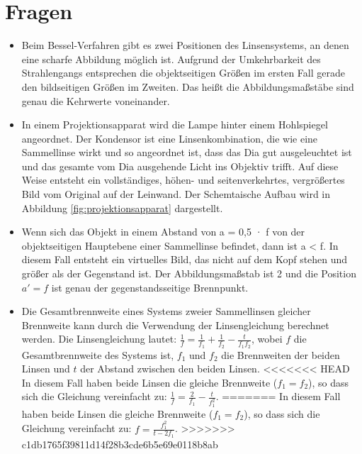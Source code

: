 \documentclass[11pt, a4paper]{article}
\begin{document}
    \section{Fragen}
    \begin{itemize}
        \item Beim Bessel-Verfahren gibt es zwei Positionen des Linsensystems, an denen eine scharfe Abbildung möglich ist. Aufgrund der Umkehrbarkeit des Strahlengangs entsprechen die objektseitigen Größen im ersten Fall gerade den bildseitigen Größen im Zweiten. Das heißt die Abbildungsmaßstäbe sind genau die Kehrwerte voneinander.
        \item In einem Projektionsapparat wird die Lampe hinter einem Hohlspiegel angeordnet. Der Kondensor ist eine Linsenkombination, die wie eine Sammellinse wirkt und so angeordnet ist, dass das Dia gut ausgeleuchtet ist und das gesamte vom Dia ausgehende Licht ins Objektiv trifft. Auf diese Weise entsteht ein vollständiges, höhen- und seitenverkehrtes, vergrößertes Bild vom Original auf der Leinwand. Der Schemtaische Aufbau wird in Abbildung \ref{fig:projektionsapparat} dargestellt.
        \item Wenn sich das Objekt in einem Abstand von a = 0,5 · f von der objektseitigen Hauptebene einer Sammellinse befindet, dann ist a < f. In diesem Fall entsteht ein virtuelles Bild, das nicht auf dem Kopf stehen und größer als der Gegenstand ist. Der Abbildungsmaßstab ist 2 und die Position $a'= f$ ist genau der gegenstandsseitige Brennpunkt.
        \item Die Gesamtbrennweite eines Systems zweier Sammellinsen gleicher Brennweite kann durch die Verwendung der Linsengleichung berechnet werden. Die Linsengleichung lautet: $\frac{1}{f} = \frac{1}{f_1} + \frac{1}{f_2} - \frac{t}{f_1 f_2}$, wobei $f$ die Gesamtbrennweite des Systems ist, $f_1$ und $f_2$ die Brennweiten der beiden Linsen und $t$ der Abstand zwischen den beiden Linsen.
<<<<<<< HEAD
        In diesem Fall haben beide Linsen die gleiche Brennweite ($f_1 = f_2$), so dass sich die Gleichung vereinfacht zu: $\frac{1}{f} = \frac{2}{f_1} - \frac{t}{f^2_1}$. 
=======
        In diesem Fall haben beide Linsen die gleiche Brennweite ($f_1 = f_2$), so dass sich die Gleichung vereinfacht zu: $f = \frac{f_1^2}{t-2f_1}$. 
>>>>>>> c1db1765f39811d14f28b3cde6b5e69e0118b8ab
    \end{itemize}
\end{document}
